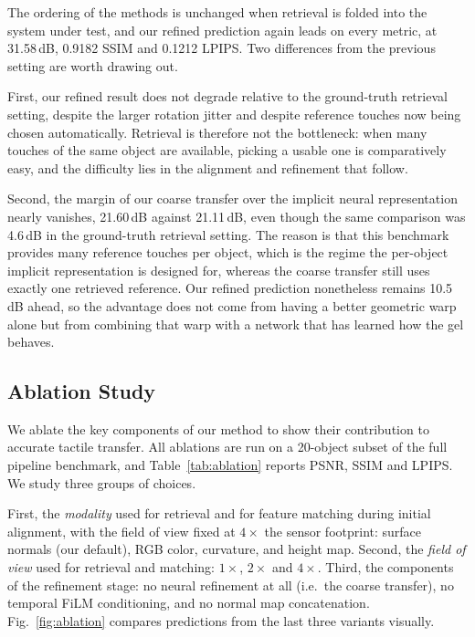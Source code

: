 

The ordering of the methods is unchanged when retrieval is folded into the system under test, and
our refined prediction again leads on every metric, at 31.58\,dB, 0.9182 SSIM and 0.1212 LPIPS.
Two differences from the previous setting are worth drawing out.

First, our refined result does not degrade relative to the ground-truth retrieval setting, despite
the larger rotation jitter and despite reference touches now being chosen automatically. Retrieval
is therefore not the bottleneck: when many touches of the same object are available, picking a
usable one is comparatively easy, and the difficulty lies in the alignment and refinement that
follow.

Second, the margin of our coarse transfer over the implicit neural representation nearly vanishes,
21.60\,dB against 21.11\,dB, even though the same comparison was 4.6\,dB in the ground-truth
retrieval setting. The reason is that this benchmark provides many reference touches per object,
which is the regime the per-object implicit representation is designed for, whereas the coarse
transfer still uses exactly one retrieved reference. Our refined prediction nonetheless remains
10.5\,dB ahead, so the advantage does not come from having a better geometric warp alone but from
combining that warp with a network that has learned how the gel behaves.

\subsection{Ablation Study}



We ablate the key components of our method to show their contribution to accurate tactile
transfer. All ablations are run on a 20-object subset of the full pipeline benchmark, and
Table~\ref{tab:ablation} reports PSNR, SSIM and LPIPS. We study three groups of choices.

First, the \emph{modality} used for retrieval and for feature matching during initial alignment,
with the field of view fixed at $4\times$ the sensor footprint: surface normals (our default),
RGB color, curvature, and height map. Second, the \emph{field of view} used for retrieval and
matching: $1\times$, $2\times$ and $4\times$. Third, the components of the refinement stage: no
neural refinement at all (i.e.\ the coarse transfer), no temporal FiLM conditioning, and no normal
map concatenation. Fig.~\ref{fig:ablation} compares predictions from the last three variants
visually.

